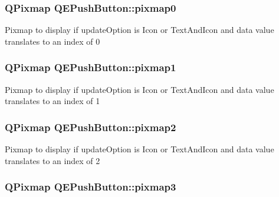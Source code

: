 \hypertarget{classQEPushButton_a345f5d33b6c338c20b7575e075eb7488}{
\subsubsection[{pixmap0}]{\setlength{\rightskip}{0pt plus 5cm}QPixmap QEPushButton::pixmap0}}
\label{classQEPushButton_a345f5d33b6c338c20b7575e075eb7488}
Pixmap to display if updateOption is Icon or TextAndIcon and data value translates to an index of 0 \hypertarget{classQEPushButton_afc73bdbd2a700cb62ce0c5de423b9e85}{
\subsubsection[{pixmap1}]{\setlength{\rightskip}{0pt plus 5cm}QPixmap QEPushButton::pixmap1}}
\label{classQEPushButton_afc73bdbd2a700cb62ce0c5de423b9e85}
Pixmap to display if updateOption is Icon or TextAndIcon and data value translates to an index of 1 \hypertarget{classQEPushButton_ac8f2f8810fce18740a578256c8648a8b}{
\subsubsection[{pixmap2}]{\setlength{\rightskip}{0pt plus 5cm}QPixmap QEPushButton::pixmap2}}
\label{classQEPushButton_ac8f2f8810fce18740a578256c8648a8b}
Pixmap to display if updateOption is Icon or TextAndIcon and data value translates to an index of 2 \hypertarget{classQEPushButton_a13af1cdcd6e4464bd9d17e57821195c6}{
\subsubsection[{pixmap3}]{\setlength{\rightskip}{0pt plus 5cm}QPixmap QEPushButton::pixmap3}}
\label{classQEPushButton_a13af1cdcd6e4464bd9d17e57821195c6}
